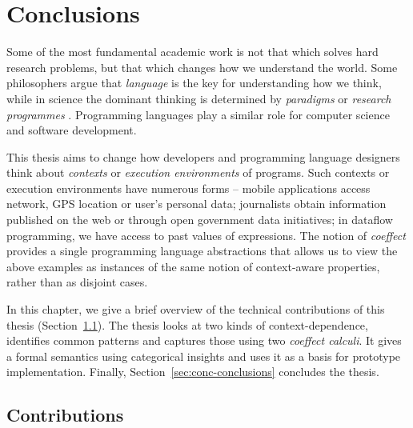 \chapter{Conclusions}
\label{ch:conclusions}

Some of the most fundamental academic work is not that which solves hard research problems, but
that which changes how we understand the world. Some philosophers argue that \emph{language} is the
key for understanding how we think, while in science the dominant thinking is determined by
\emph{paradigms} \cite{philosophy-kuhn} or \emph{research programmes} \cite{philosophy-lakatos}.
Programming languages play a similar role for computer science and software development.

This thesis aims to change how developers and programming language designers think about
\emph{contexts} or \emph{execution environments} of programs. Such contexts or execution environments
have numerous forms -- mobile applications access network, GPS location or user's personal data;
journalists obtain information published on the web or through open government data initiatives;
in dataflow programming, we have access to past values of expressions. The notion of \emph{coeffect}
provides a single programming language abstractions that allows us to view the above examples as
instances of the same notion of context-aware properties, rather than as disjoint cases.

In this chapter, we give a brief overview of the technical contributions of this thesis
(Section~\ref{sec:conc-summary}). The thesis looks at two kinds of context-dependence, identifies
common patterns and captures those using two \emph{coeffect calculi}. It gives a formal semantics
using categorical insights and uses it as a basis for prototype implementation. Finally,
Section~\ref{sec:conc-conclusions} concludes the thesis.


%
%

\section{Contributions}
\label{sec:conc-summary}

